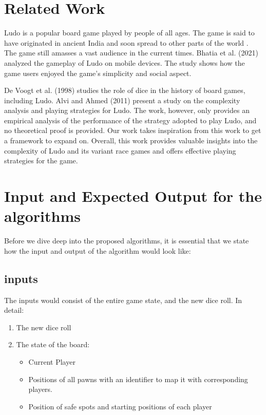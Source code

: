 \documentclass{article} %
\begin{document}
\section{Related Work}
Ludo is a popular board game played by people of all ages. The game is said to have originated in ancient India and soon spread to other parts of the world \cite{wiki:Ludo}. The game still amasses a vast audience in the current times. Bhatia et al. (2021) \cite{bhatia2021analysis} analyzed the gameplay of Ludo on mobile devices. The study shows how the game users enjoyed the game’s simplicity and social aspect.

De Voogt et al. (1998) \cite{derole} studies the role of dice in the history of board games, including Ludo. Alvi and Ahmed (2011) \cite{alvi2011complexity} present a study on the complexity analysis and playing strategies for Ludo. The work, however, only provides an empirical analysis of the performance of the strategy adopted to play Ludo, and no theoretical proof is provided. Our work takes inspiration from this work to get a framework to expand on. Overall, this work provides valuable insights into the complexity of Ludo and its variant race games and offers effective playing strategies for the game.


\section{Input and Expected Output for the algorithms}
Before we dive deep into the proposed algorithms, it is essential that we state how the input and output of the algorithm would look like:
\subsection{inputs}
The inputs would consist of the entire game state, and the new dice roll. In detail:
\begin{enumerate}
    \item The new dice roll
    \item The state of the board:
    \begin{itemize}
    
    
    \item Current Player
    \item Positions of all pawns with an identifier to map it with corresponding players.
    \item Position of safe spots and starting positions of each player
    \end{itemize}
\end{enumerate}
\end{document}
